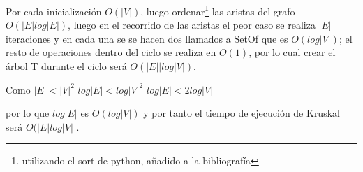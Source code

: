 \documentclass[12pt]{article}
\begin{document}
Por cada inicializaci\'on $O(|V|)$, luego ordenar\footnote{utilizando el sort de python, a\~nadido a la bibliograf\'ia} las aristas del grafo $O(|E|log|E|)$, luego en el recorrido de las aristas el peor caso se realiza
$|E|$ iteraciones y en cada una se se hacen dos llamados a SetOf que es $O(log|V|)$; el resto de operaciones dentro del ciclo se realiza en
$O(1)$, por lo cual crear el \'arbol T durante el ciclo ser\'a $O(|E||log|V|)$.

Como $|E| < |V|^2$
$log|E| < log|V|^2$ 
$log|E| < 2log |V|$

por lo que $log|E|$ es $O(log|V|)$ y por tanto el tiempo de ejecuci\'on de Kruskal ser\'a $O(|E|log|V|$ . 



\end{document}
